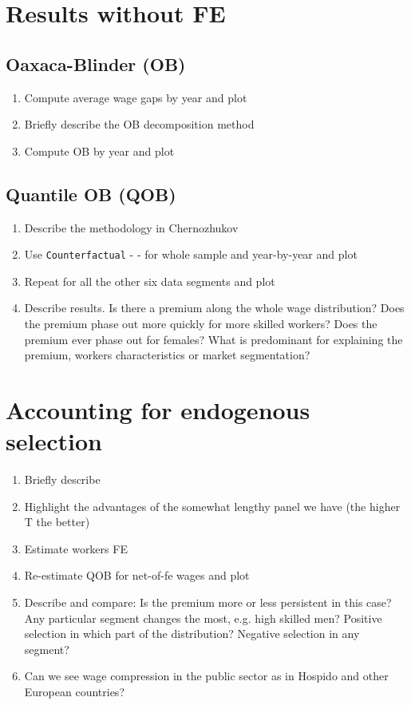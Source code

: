 \documentclass{article}
\begin{document}
\section{Results without FE}
\subsection{Oaxaca-Blinder (OB)}
\begin{enumerate}
    \item Compute average wage gaps by year and plot
    \item Briefly describe the OB decomposition method
    \item Compute OB by year and plot
\end{enumerate}

\subsection{Quantile OB (QOB)}
\begin{enumerate}
    \item Describe the methodology in Chernozhukov 
    \item Use \texttt{Counterfactual} - \cite{Chen2017} -  for whole sample and year-by-year and plot
    \item Repeat for all the other six data segments and plot
    \item Describe results. Is there a premium along the whole wage distribution? Does the premium phase out more quickly for more skilled workers? Does the premium ever phase out for females? What is predominant for explaining the premium, workers characteristics or market segmentation?
\end{enumerate}

\section{Accounting for endogenous selection}
\begin{enumerate}
    \item Briefly describe \cite{Canay2011} \cite{}
    \item Highlight the advantages of the somewhat lengthy panel we have (the higher T the better)
    \item Estimate workers FE
    \item Re-estimate QOB for net-of-fe wages and plot
    \item Describe and compare: Is the premium more or less persistent in this case? Any particular segment changes the most, e.g. high skilled men? Positive selection in which part of the distribution? Negative selection in any segment? 
    \item Can we see wage compression in the public sector as in Hospido and other European countries?
\end{enumerate}
\end{document}
